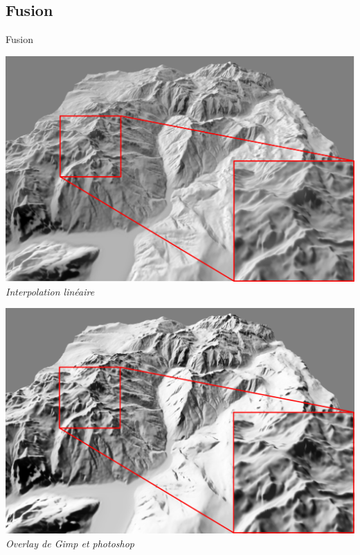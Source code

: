 \documentclass{beamer}
\begin{document}
\subsection*{Fusion}
\begin{frame}{Fusion}
\begin{center}
	\begin{minipage}[t]{0.32\linewidth}
    \begin{center}
    	\includegraphics[width=1.0\linewidth]{Resultats/ShadeLineaire.png}\\
 		\textit{Interpolation linéaire}
    \end{center}
    \end{minipage}
    \begin{minipage}[t]{0.32\linewidth}
    \begin{center}
    	\includegraphics[width=1.0\linewidth]{Resultats/ShadeOverlay.png}\\
 		\textit{Overlay de Gimp et photoshop}

\end{center}
\end{minipage}
\end{center}
\end{frame}
\end{document}
